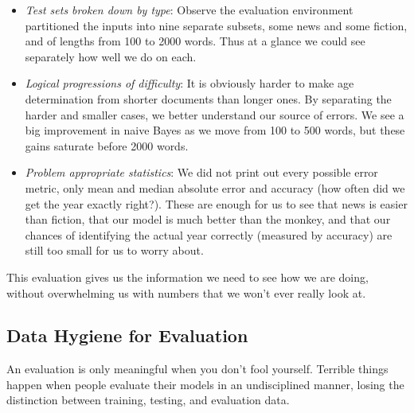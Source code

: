 \documentclass[10pt]{article}
\begin{document}
\begin{itemize}
  \item \textit{Test sets broken down by type}: Observe the evaluation environment partitioned the inputs into nine separate subsets, some news and some fiction, and of lengths from 100 to 2000 words. Thus at a glance we could see separately how well we do on each.
  \item \textit{Logical progressions of difficulty}: It is obviously harder to make age determination from shorter documents than longer ones. By separating the harder and smaller cases, we better understand our source of errors. We see a big improvement in naive Bayes as we move from 100 to 500 words, but these gains saturate before 2000 words.
  \item \textit{Problem appropriate statistics}: We did not print out every possible error metric, only mean and median absolute error and accuracy (how often did we get the year exactly right?). These are enough for us to see that news is easier than fiction, that our model is much better than the monkey, and that our chances of identifying the actual year correctly (measured by accuracy) are still too small for us to worry about.
\end{itemize}

This evaluation gives us the information we need to see how we are doing, without overwhelming us with numbers that we won't ever really look at.

\subsection{Data Hygiene for Evaluation}
An evaluation is only meaningful when you don't fool yourself. Terrible things happen when people evaluate their models in an undisciplined manner, losing the distinction between training, testing, and evaluation data.
\end{document}
